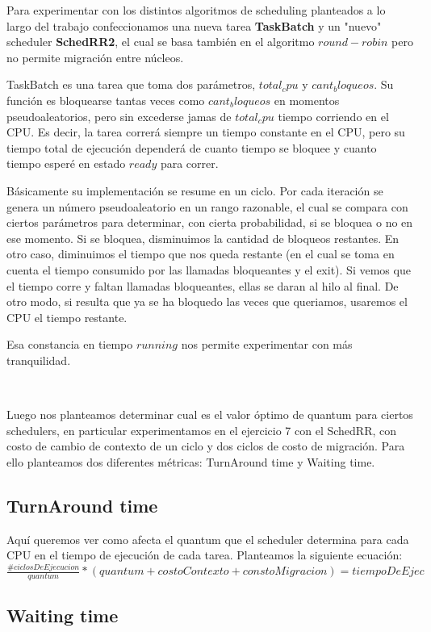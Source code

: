 Para experimentar con los distintos algoritmos de scheduling planteados a lo largo del trabajo confeccionamos una nueva tarea 
\textbf{TaskBatch} y un "nuevo" scheduler \textbf{SchedRR2}, el cual se basa también en el algoritmo $round-robin$ pero no permite migración entre núcleos.

TaskBatch es una tarea que toma dos parámetros, $total_cpu$ y $cant_bloqueos$. Su función es bloquearse tantas veces como $cant_bloqueos$ en momentos pseudoaleatorios, pero sin excederse jamas de $total_cpu$ tiempo corriendo en el CPU. Es decir, la tarea correrá siempre un tiempo constante en el CPU, pero su tiempo total de ejecución dependerá de cuanto tiempo se bloquee y cuanto tiempo esperé en estado $ready$ para correr.

Básicamente su implementación se resume en un ciclo. Por cada iteración se genera un número pseudoaleatorio en un rango razonable, el cual se compara con ciertos parámetros para determinar, con cierta probabilidad, si se bloquea o no en ese momento. Si se bloquea, disminuimos la cantidad de bloqueos restantes. En otro caso, diminuimos el tiempo que nos queda restante (en el cual se toma en cuenta el tiempo consumido por las llamadas bloqueantes y el exit). Si vemos que el tiempo corre y faltan llamadas bloqueantes, ellas se daran al hilo al final. De otro modo, si resulta que ya se ha bloquedo las veces que queriamos, usaremos el CPU el tiempo restante.

Esa constancia en tiempo $running$ nos permite experimentar con más tranquilidad.

~

Luego nos planteamos determinar cual es el valor óptimo de quantum para ciertos schedulers, en particular experimentamos en el ejercicio 7 con el SchedRR, con costo de cambio de contexto de un ciclo y dos ciclos de costo de migración. Para ello planteamos dos diferentes métricas: TurnAround time y Waiting time.

\subsection{TurnAround time}

Aquí queremos ver como afecta el quantum que el scheduler determina para cada CPU en el tiempo de ejecución de cada tarea. Planteamos la siguiente ecuación:
\centering $\frac{\#ciclosDeEjecucion}{quantum} * (quantum + costoContexto + constoMigracion) = tiempoDeEjec$



\subsection{Waiting time}
